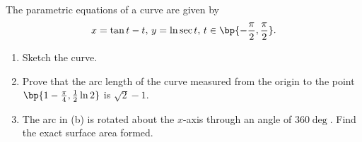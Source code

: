 \clearpage
\begin{problem}
    The parametric equations of a curve are given by \[x = \tan t - t, \, y = \ln \sec t, \, t \in \bp{-\frac\pi2, \frac\pi2}.\]

    \begin{enumerate}
        \item Sketch the curve.
        \item Prove that the arc length of the curve measured from the origin to the point $\bp{1 - \frac\pi4, \frac12 \ln 2}$ is $\sqrt2 - 1$.
        \item The arc in (b) is rotated about the $x$-axis through an angle of $360 \deg$. Find the exact surface area formed.
    \end{enumerate}
\end{problem}
\begin{solution}
    \begin{ppart}
        \begin{center}
\end{center}
\end{ppart}
\end{solution}
